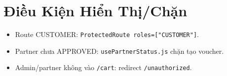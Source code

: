 \section{Điều Kiện Hiển Thị/Chặn}
\begin{itemize}[leftmargin=1.2cm]
  \item Route CUSTOMER: \texttt{ProtectedRoute roles=["CUSTOMER"]}.
  \item Partner chưa APPROVED: \texttt{usePartnerStatus.js} chặn tạo voucher.
  \item Admin/partner không vào \texttt{/cart}: redirect \texttt{/unauthorized}.
\end{itemize}
